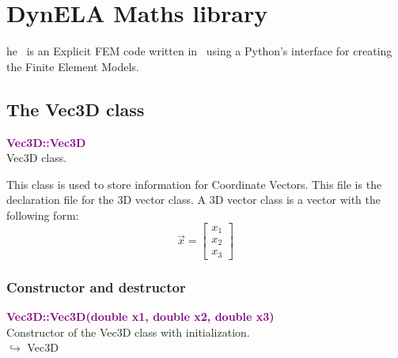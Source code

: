 %
%
%
\chapter{DynELA Maths library}

\startcontents[chapters]
\printmyminitoc[2]he \DynELA~is an Explicit FEM code written in \Cpp~using a Python's interface for creating the Finite Element Models. 

\section{The Vec3D class}

\textcolor{purple}{\textbf{Vec3D::Vec3D}}\label{Vec3D::Vec3D}\\
Vec3D class.

This class is used to store information for Coordinate Vectors.
This file is the declaration file for the 3D vector class. A 3D vector class is a vector with the following form:
\begin{equation*}
\overrightarrow{x}=\left[\begin{array}{c}
  x_{1}\\
  x_{2}\\
  x_{3}
  \end{array}\right]
\end{equation*}

\subsection{Constructor and destructor}

\textcolor{purple}{\textbf{Vec3D::Vec3D(double x1, double x2, double x3)}}\label{Vec3D::Vec3D(double x1, double x2, double x3)}\\
Constructor of the Vec3D class with initialization.\\ \hspace*{10mm}$\hookrightarrow$ Vec3D

